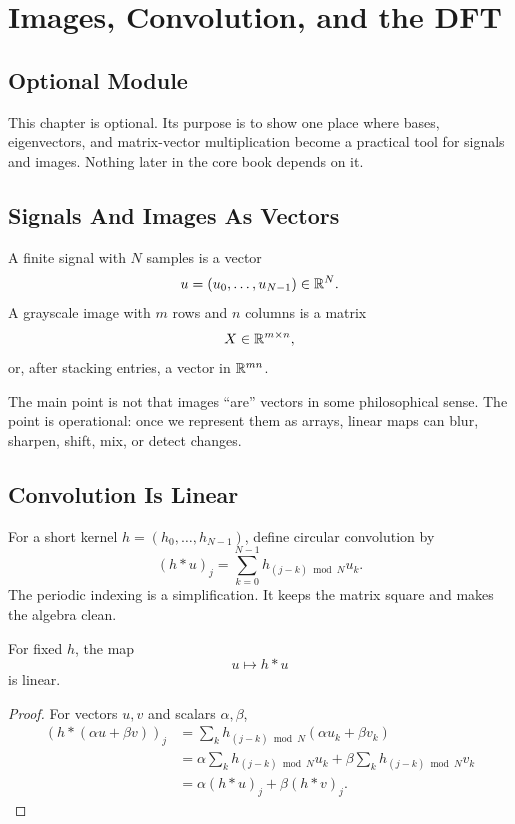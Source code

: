 \chapter{Images, Convolution, and the DFT}
\label{ch:images-convolution-dft}

\section{Optional Module}

This chapter is optional. Its purpose is to show one place where bases,
eigenvectors, and matrix-vector multiplication become a practical tool for
signals and images. Nothing later in the core book depends on it.

\section{Signals And Images As Vectors}

A finite signal with $N$ samples is a vector
\[
  u=(u_0,\ldots,u_{N-1})\in\mathbb{R}^N.
\]
A grayscale image with $m$ rows and $n$ columns is a matrix
\[
  X\in\mathbb{R}^{m\times n},
\]
or, after stacking entries, a vector in $\mathbb{R}^{mn}$.

The main point is not that images ``are'' vectors in some philosophical sense.
The point is operational: once we represent them as arrays, linear maps can
blur, sharpen, shift, mix, or detect changes.

\section{Convolution Is Linear}

For a short kernel $h=(h_0,\ldots,h_{N-1})$, define circular convolution by
\[
  (h*u)_j=\sum_{k=0}^{N-1} h_{(j-k)\bmod N}u_k.
\]
The periodic indexing is a simplification. It keeps the matrix square and
makes the algebra clean.

\begin{proposition}
For fixed $h$, the map
\[
  u\mapsto h*u
\]
is linear.
\end{proposition}

\begin{proof}
For vectors $u,v$ and scalars $\alpha,\beta$,
\[
\begin{aligned}
  (h*(\alpha u+\beta v))_j
  &=
  \sum_k h_{(j-k)\bmod N}(\alpha u_k+\beta v_k) \\
  &=
  \alpha\sum_k h_{(j-k)\bmod N}u_k
  +
  \beta\sum_k h_{(j-k)\bmod N}v_k \\
  &=
  \alpha(h*u)_j+\beta(h*v)_j.
\end{aligned}
\]
\end{proof}

